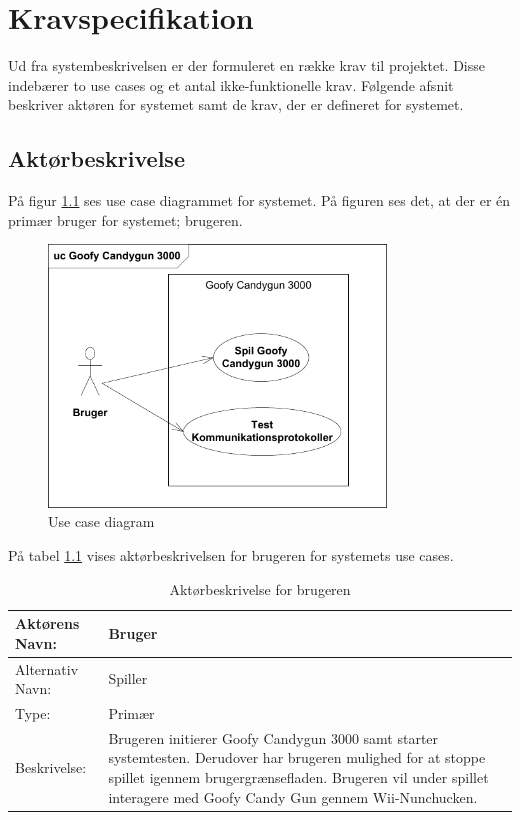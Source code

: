 \chapter{Kravspecifikation}
Ud fra systembeskrivelsen er der formuleret en række krav til projektet. Disse indebærer to use cases og et antal ikke-funktionelle krav. Følgende afsnit beskriver aktøren for systemet samt de krav, der er defineret for systemet.

\section{Aktørbeskrivelse}
På figur \ref{fig:useCaseDiagram} ses use case diagrammet for systemet. På figuren ses det, at der er én primær bruger for systemet; brugeren. 

\begin{figure}[H]
	\centering
	\includegraphics[width=0.80\textwidth]{Kravsspecifikation/images/usecaseDiagram}
	\caption{Use case diagram}
	\label{fig:useCaseDiagram}
\end{figure}

\noindent På tabel \ref{table:actor} vises aktørbeskrivelsen for brugeren for systemets use cases. 
\begin{table}[H]
	\begin{tabularx}{\textwidth}{| p{2cm} | p{9.1cm} |}
		\hline
		Aktørens Navn: & Bruger \\ 
		\hline
		Alternativ Navn: & Spiller \\
		\hline
		Type: & Primær \\
		\hline
		Beskrivelse: & Brugeren initierer Goofy Candygun 3000 samt starter systemtesten. Derudover har brugeren mulighed for at stoppe spillet igennem brugergrænsefladen. Brugeren vil under spillet interagere med Goofy Candy Gun gennem Wii-Nunchucken.
		\\ \hline
	\end{tabularx}
	\caption{Aktørbeskrivelse for brugeren}
	\label{table:actor}
\end{table}


